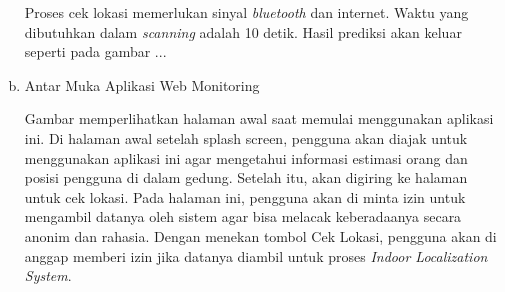 \begin{enumerate}[a.]

	      \par Proses cek lokasi memerlukan sinyal \textit{bluetooth} dan internet. Waktu yang dibutuhkan dalam \textit{scanning} adalah 10 detik. Hasil prediksi akan keluar seperti pada gambar ...



	\item Antar Muka Aplikasi Web Monitoring

	      \par Gambar memperlihatkan halaman awal saat memulai menggunakan aplikasi ini. Di halaman awal setelah splash screen, pengguna akan diajak untuk menggunakan aplikasi ini agar mengetahui informasi estimasi orang dan posisi pengguna di dalam gedung. Setelah itu, akan digiring ke halaman untuk cek lokasi. Pada halaman ini, pengguna akan di minta izin untuk mengambil datanya oleh sistem agar bisa melacak keberadaanya secara anonim dan rahasia. Dengan menekan tombol Cek Lokasi, pengguna akan di anggap memberi izin jika datanya diambil untuk proses \textit{Indoor Localization System}.



\end{enumerate}
